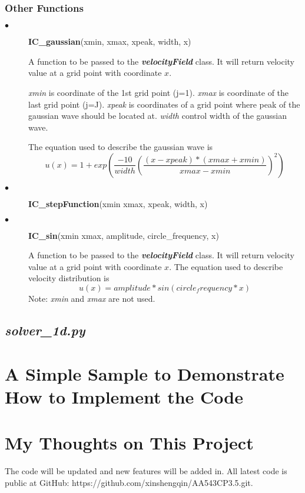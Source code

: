 \documentclass[11pt]{article}
\begin{document}
        \subsubsection{Other Functions}
        \begin{description}
            \item[$\bullet$]\textbf{IC\_gaussian}(xmin, xmax, xpeak, width, x)
                \par
                A function to be passed to the \textbf{\textit{velocityField}} class. 
                It will return velocity value at a grid point with coordinate $x$.
                \par
                \textit{xmin} is coordinate of the 1st grid point (j=1).
                \textit{xmax} is coordinate of the last grid point (j=J).
                \textit{xpeak} is coordinates of a grid point where peak of the gaussian wave should be located at.
                \textit{width} control width of the gaussian wave.
                \par
                The equation used to describe the gaussian wave is 
                $$ u(x) = 1 + exp({\frac{-10}{width}(\frac{(x-xpeak)*(xmax+xmin)}{xmax-xmin})^2}) $$

            \item[$\bullet$]\textbf{IC\_stepFunction}(xmin xmax, xpeak, width, x)
                \par
            \item[$\bullet$]\textbf{IC\_sin}(xmin xmax, amplitude, circle\_frequency, x)
                \par
                A function to be passed to the \textbf{\textit{velocityField}} class. 
                It will return velocity value at a grid point with coordinate $x$.
                The equation used to describe velocity distribution is
                $$ u(x) = amplitude*sin(circle_frequency*x) $$
                Note: \textit{xmin} and \textit{xmax} are not used.

        \end{description}

    \subsection{\textbf{\textit{solver\_1d.py}}}
\section{A Simple Sample to Demonstrate How to Implement the Code} 
\section{My Thoughts on This Project}

The code will be updated and new features will be added in. 
All latest code is public at GitHub: https://github.com/xinshengqin/AA543CP3.5.git. 
\end{document}
